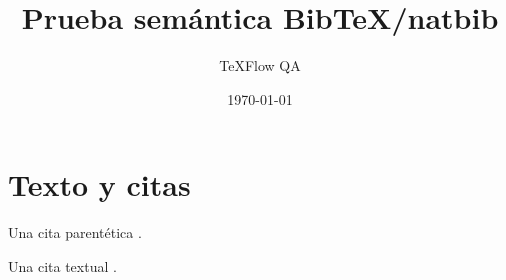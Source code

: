 \documentclass[11pt,a4paper]{article}
\title{Prueba semántica BibTeX/natbib}
\author{TeXFlow QA}
\date{\today}
\begin{document}
\maketitle

\section{Texto y citas}

Una cita parentética \citep{acemoglu2001}.

Una cita textual \citet{angrist2009}.



\end{document}
